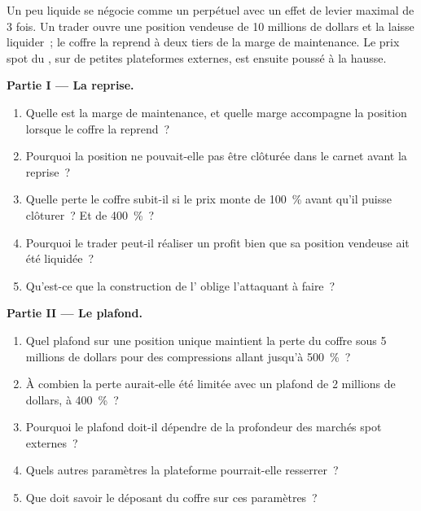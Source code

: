 \begin{problem}\label{pb:m3:on-chain-order-books-and-perpetual-dexs:1}
Un  peu liquide se négocie comme un perpétuel avec un effet de levier maximal de 3 fois. Un trader ouvre une position vendeuse de 10 millions de dollars et la laisse liquider~; le coffre la reprend à deux
tiers de la marge de maintenance. Le prix spot du , sur de petites plateformes externes, est ensuite poussé à la hausse.

\medskip\noindent\textbf{Partie I --- La reprise.}
\begin{enumerate}
\item Quelle est la marge de maintenance, et quelle marge accompagne la position lorsque le coffre la reprend~?
\item Pourquoi la position ne pouvait-elle pas être clôturée dans le carnet avant la reprise~?
\item Quelle perte le coffre subit-il si le prix monte de 100~\% avant qu'il puisse clôturer~? Et de 400~\%~?
\item Pourquoi le trader peut-il réaliser un profit bien que sa position vendeuse ait été liquidée~?
\item Qu'est-ce que la construction de l' oblige l'attaquant à faire~?
\end{enumerate}

\medskip\noindent\textbf{Partie II --- Le plafond.}
\begin{enumerate}[resume]
\item Quel plafond sur une position unique maintient la perte du coffre sous 5 millions de dollars pour des compressions allant jusqu'à 500~\%~?
\item À combien la perte aurait-elle été limitée avec un plafond de 2 millions de dollars, à 400~\%~?
\item Pourquoi le plafond doit-il dépendre de la profondeur des marchés spot externes~?
\item Quels autres paramètres la plateforme pourrait-elle resserrer~?
\item Que doit savoir le déposant du coffre sur ces paramètres~?
\end{enumerate}


\end{problem}
